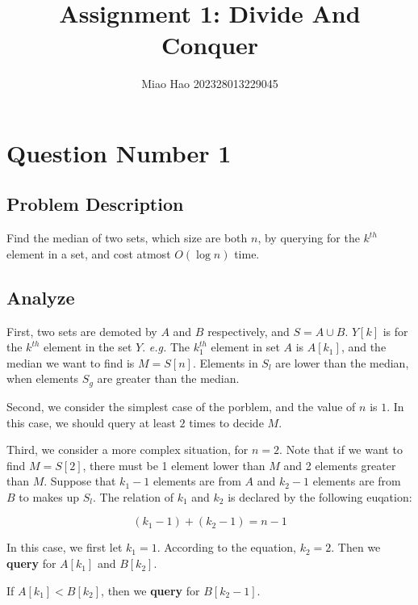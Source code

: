 \documentclass{article}
\title{Assignment 1: Divide And Conquer}
\author{Miao Hao 202328013229045}
\newcommand{\bftit}[1]{\noindent\textbf{#1}}
\begin{document}
    \maketitle
    \Large
    \section{Question Number 1}
    
    \subsection{\bftit{Problem Description}}
    
    Find the median of two sets, which size are both $n$, by querying for the $k^{th}$ element in a set, and cost atmost $O(\log{n})$ time.

    \subsection{\bftit{Analyze}}

    First, two sets are demoted by $A$ and $B$ respectively, and $S = A \cup B$. $Y[k]$ is for the $k^{th}$ element in the set $Y$. \textit{e.g.} The $k_{1}^{th}$ element in set $A$ is $A[k_{1}]$, and the median we want to find is $M = S[n]$. Elements in $S_{l}$ are lower than the median, when elements $S_{g}$ are greater than the median.

    Second, we consider the simplest case of the porblem, and the value of $n$ is $1$. In this case, we should query at least $2$ times to decide $M$.

    Third, we consider a more complex situation, for $n = 2$. Note that if we want to find $M = S[2]$, there must be 1 element lower than $M$ and 2 elements greater than $M$. Suppose that $k_{1} - 1$ elements are from $A$ and $k_{2} - 1$ elements are from $B$ to makes up $S_{l}$. The relation of $k_{1}$ and $k_{2}$ is declared by the following euqation:
    
    \begin{equation}
        (k_{1} - 1) + (k_{2} - 1) = n - 1 \label{e1}
    \end{equation}
    
    In this case, we first let $k_{1} = 1$. According to the equation, $k_{2} = 2$. Then we \textbf{query} for $A[k_1]$ and $B[k_2]$. 
    
    If $A[k_1] < B[k_2]$, then we \textbf{query} for $B[k_2 - 1]$. 
    
\end{document}
